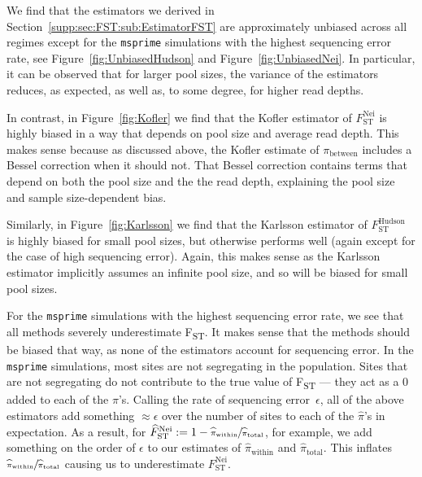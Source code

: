 \documentclass[letterpaper,fontsize=9pt,DIV=12]{scrartcl}
\newcommand\figref[1]{Figure~\ref{#1}}
\newcommand{\fst}{F\textsubscript{ST}}
\newcommand{\neifst}{F_\text{ST}^\text{Nei}}
\newcommand{\hudsonfst}{F_\text{ST}^\text{Hudson}}
\newcommand{\neiestimator}{\widehat{F}_\text{ST}^\text{Nei}}
\begin{document}
We find that the estimators we derived in Section~\ref{supp:sec:FST:sub:EstimatorFST} are approximately unbiased across all regimes except for the \texttt{msprime} simulations with the highest sequencing error rate, see \figref{fig:UnbiasedHudson} and \figref{fig:UnbiasedNei}. In particular, it can be observed that for larger pool sizes, the variance of the estimators reduces, as expected, as well as, to some degree, for higher read depths.

In contrast, in \figref{fig:Kofler} we find that the Kofler estimator of $\neifst$ is highly biased in a way that depends on pool size and average read depth.  This makes sense because as discussed above, the Kofler estimate of $\pi_\text{between}$ includes a Bessel correction when it should not.  That Bessel correction contains terms that depend on both the pool size and the the read depth, explaining the pool size and sample size-dependent bias.

Similarly, in \figref{fig:Karlsson} we find that the Karlsson estimator of $\hudsonfst$ is highly biased for small pool sizes, but otherwise performs well (again except for the case of high sequencing error).  Again, this makes sense as the Karlsson estimator implicitly assumes an infinite pool size, and so will be biased for small pool sizes.

For the \texttt{msprime} simulations with the highest sequencing error rate, we see that all methods severely underestimate \fst.  It makes sense that the methods should be biased that way, as none of the estimators account for sequencing error. In the \texttt{msprime} simulations, most sites are not segregating in the population.  Sites that are not segregating do not contribute to the true value of \fst{} --- they act as a $0$ added to each of the $\pi$'s. Calling the rate of sequencing error~$\epsilon$, all of the above estimators add something $\approx \epsilon$ over the number of sites to each of the $\widehat{\pi}$'s in expectation.  As a result, for $\neiestimator := 1 - \sfrac{\widehat{\pi}_\text{within}}{\widehat{\pi}_\text{total}}$, for example, we add something on the order of $\epsilon$ to our estimates of $\widehat{\pi}_\text{within}$ and $\widehat{\pi}_\text{total}$.  This inflates $\sfrac{\widehat{\pi}_\text{within}}{\widehat{\pi}_\text{total}}$ causing us to underestimate $\neifst$.  
\end{document}
